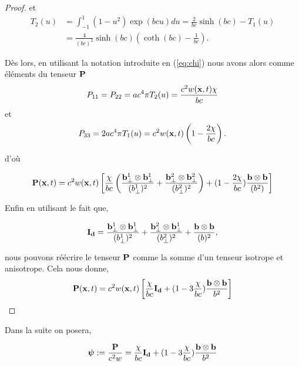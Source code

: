\begin{proof}
et
\begin{equation}
\begin{aligned}
T_2(u) &= \int_{-1}^{1} (1-u^2) \exp(bcu) du = \frac{2}{bc}\sinh(bc)  - T_1(u)\\
&= \frac{4}{(bc)^2}\sinh(bc) \left(\coth(bc) - \frac{1}{bc} \right).
\end{aligned}
\end{equation}


Dès lors, en utilisant la notation introduite en (\ref{eq:chi}) nous avons 
alors comme éléments du tenseur $\mathbf{P}$
\begin{equation}
P_{11} = P_{22} = ac^4\pi T_2(u)  =  \frac{c^2w(\mathbf{x},t)\chi}{bc}
\end{equation}
et
\begin{equation}
P_{33} = 2ac^4\pi T_1(u) = c^2 w(\mathbf{x},t) \left( 1 - \frac{2\chi}{bc}\right).
\end{equation}

d'où

\begin{equation}
  \label{eq:PP1}
  \mathbf{P}(\mathbf{x},t) = c^2 w(\mathbf{x},t)  \left[  \frac{\chi}{bc}  \left( 
  \frac{\mathbf{b}_{\perp}^1 \otimes \mathbf{b}_{\perp}^1}{ (b_{\perp}^1)^2} 
  +\frac{\mathbf{b}_{\perp}^2 \otimes \mathbf{b}_{\perp}^2}{ (b_{\perp}^2)^2}\right)
  + ( 1 - \frac{2\chi}{bc} ) \frac{\mathbf{b} \otimes \mathbf{b}}{ (b^2)} \right]
\end{equation}

Enfin en utilisant le fait que,

\begin{equation}
  \mathbf{I_d}  = \frac{\mathbf{b}_{\perp}^1 \otimes \mathbf{b}_{\perp}^1}{ (b_{\perp}^1)^2} 
  + \frac{\mathbf{b}_{\perp}^2 \otimes \mathbf{b}_{\perp}^1}{ (b_{\perp}^2)^2} 
  +  \frac{\mathbf{b} \otimes \mathbf{b}}{ (b)^2},
\end{equation}

nous pouvons réécrire le tenseur  $\mathbf{P}$ comme la somme d'un tenseur isotrope et
 anisotrope. Cela nous donne,
\begin{equation}
  \mathbf{P}(\mathbf{x},t) =  c^2 w(\mathbf{x},t) \left[\frac{\chi}{bc} \mathbf{I_d} 
  + ( 1 - 3\frac{\chi}{bc}) \frac{\mathbf{b} \otimes \mathbf{b}}{b^2} \right]
\end{equation}

\end{proof}
 
 
Dans la suite on posera,

\begin{equation}
\bm{\psi} := \frac{\mathbf{P}}{c^2w} =  \frac{\chi}{bc} \mathbf{I_d} + ( 1 - 3\frac{\chi}{bc}) \frac{\mathbf{b} \otimes \mathbf{b}}{b^2}
\end{equation}

